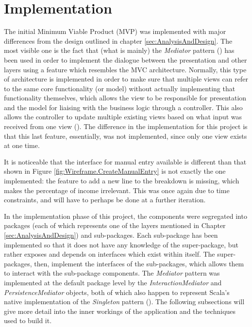 \section{Implementation} \label{sec:Implementation}

The initial Minimum Viable Product (MVP) was implemented with major
differences from the design outlined in chapter \ref{sec:AnalysisAndDesign}.
The most visible one is the fact that (what is mainly) the \emph{Mediator}
pattern (\cite[][Ch.~9,~Location~3594]{nikolov2016scala}) has been used in
order to implement the dialogue between the presentation and other layers using
a feature which resembles the MVC architecture. Normally, this type of
architecture is implemented in order to make sure that multiple views can refer
to the same core functionality (or model) without actually implementing that
functionality themselves, which allows the view to be responsible for
presentation and the model for liaising with the business logic through a
controller. This also allows the controller to update multiple existing views
based on what input was received from one view
(\cite[][p.~381]{bennett2010object}). The difference in the implementation for
this project is that this last feature, essentially, was not implemented, since
only one view exists at one time.

It is noticeable that the interface for manual entry available is different
than that shown in Figure \ref{fig:Wireframe.CreateManualEntry} is not exactly
the one implemented: the feature to add a new line to the breakdown is missing,
which makes the percentage of income irrelevant. This was once again due to
time constraints, and will have to perhaps be done at a further iteration.

In the implementation phase of this project, the components were segregated
into packages (each of which represents one of the layers mentioned in Chapter
\ref{sec:AnalysisAndDesign}) and sub-packages. Each sub-package has been
implemented so that it does not have any knowledge of the super-package, but
rather exposes and depends on interfaces which exist within itself. The
super-packages, then, implement the interfaces of the sub-packages, which
allows them to interact with the sub-package components. The \emph{Mediator}
pattern was implemented at the default package level by the
\emph{InteractionMediator} and \emph{PersistenceMediator} objects, both of
which also happen to represent Scala's native implementation of the
\emph{Singleton} pattern (\cite[][Ch.~6,~Location.~2242]{nikolov2016scala}).
The following subsections will give more detail into the inner workings of the
application and the techniques used to build it.

